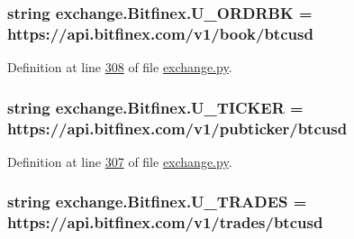 \subsubsection[{\texorpdfstring{U\+\_\+\+O\+R\+D\+R\+BK}{U_ORDRBK}}]{\setlength{\rightskip}{0pt plus 5cm}string exchange.\+Bitfinex.\+U\+\_\+\+O\+R\+D\+R\+BK = \textquotesingle{}https\+://api.\+bitfinex.\+com/v1/book/btcusd\textquotesingle{}\hspace{0.3cm}{\ttfamily [static]}}\hypertarget{classexchange_1_1_bitfinex_a81c1548dbbb9caacf43e8a6a6e8be3a4}{}\label{classexchange_1_1_bitfinex_a81c1548dbbb9caacf43e8a6a6e8be3a4}


Definition at line \hyperlink{exchange_8py_source_l00308}{308} of file \hyperlink{exchange_8py_source}{exchange.\+py}.

\subsubsection[{\texorpdfstring{U\+\_\+\+T\+I\+C\+K\+ER}{U_TICKER}}]{\setlength{\rightskip}{0pt plus 5cm}string exchange.\+Bitfinex.\+U\+\_\+\+T\+I\+C\+K\+ER = \textquotesingle{}https\+://api.\+bitfinex.\+com/v1/pubticker/btcusd\textquotesingle{}\hspace{0.3cm}{\ttfamily [static]}}\hypertarget{classexchange_1_1_bitfinex_a2980dc6a7a3d6a4391ba0b2fbadfacee}{}\label{classexchange_1_1_bitfinex_a2980dc6a7a3d6a4391ba0b2fbadfacee}


Definition at line \hyperlink{exchange_8py_source_l00307}{307} of file \hyperlink{exchange_8py_source}{exchange.\+py}.

\subsubsection[{\texorpdfstring{U\+\_\+\+T\+R\+A\+D\+ES}{U_TRADES}}]{\setlength{\rightskip}{0pt plus 5cm}string exchange.\+Bitfinex.\+U\+\_\+\+T\+R\+A\+D\+ES = \textquotesingle{}https\+://api.\+bitfinex.\+com/v1/{\bf trades}/btcusd\textquotesingle{}\hspace{0.3cm}{\ttfamily [static]}}\hypertarget{classexchange_1_1_bitfinex_a0c5420b5b95248ee7b57bf694b21f3b5}{}\label{classexchange_1_1_bitfinex_a0c5420b5b95248ee7b57bf694b21f3b5}


